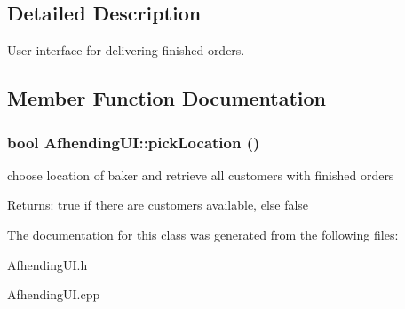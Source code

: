 \subsection{Detailed Description}
User interface for delivering finished orders. 



\subsection{Member Function Documentation}
\hypertarget{class_afhending_u_i_74d0d6b7d7493e8a9703bc8fbeb79f2e}{
\subsubsection[pickLocation]{\setlength{\rightskip}{0pt plus 5cm}bool Afhending\-UI::pick\-Location ()}}
\label{class_afhending_u_i_74d0d6b7d7493e8a9703bc8fbeb79f2e}


choose location of baker and retrieve all customers with finished orders 

\begin{Desc}
\item[Returns:]true if there are customers available, else false \end{Desc}


The documentation for this class was generated from the following files:\begin{CompactItemize}
\item 
Afhending\-UI.h\item 
Afhending\-UI.cpp\end{CompactItemize}
